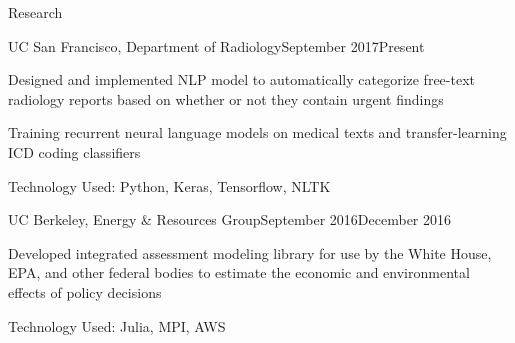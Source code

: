 \documentclass{resume} %
\begin{document}
\begin{rSection}{Research}
\begin{rSubsection}{UC San Francisco, Department of Radiology}{September 2017\textminus Present}{}{}
\item[] Designed and implemented NLP model to automatically categorize free-text radiology reports based on whether or not they contain urgent findings
\item[] Training recurrent neural language models on medical texts and transfer-learning ICD coding classifiers
\item[] Technology Used: Python, Keras, Tensorflow, NLTK
\end{rSubsection}
\begin{rSubsection}{UC Berkeley, Energy \& Resources Group}{September 2016\textminus December 2016}{}{}
\item[] Developed integrated assessment modeling library for use by the White House, EPA, and other federal bodies to estimate the economic and environmental effects of policy decisions
\item[] Technology Used: Julia, MPI, AWS
\end{rSubsection}
\end{rSection}






\end{document}
